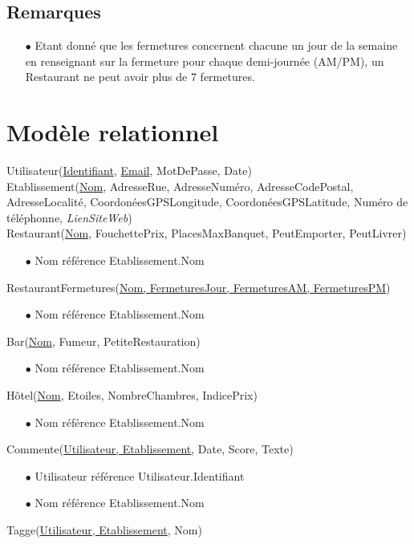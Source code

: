 \documentclass[a4paper, 11pt]{article}
\begin{document}
\subsection*{Remarques}
\begin{itemize}
	\item[$\bullet$] Etant donné que les fermetures concernent chacune un jour de la semaine en renseignant sur la fermeture pour chaque demi-journée (AM/PM), un Restaurant ne peut avoir plus de 7 fermetures. 
\end{itemize}

\section*{Modèle relationnel}
\noindent
Utilisateur(\underline{Identifiant}, \underline{Email}, MotDePasse, Date)\\
Etablissement(\underline{Nom}, AdresseRue, AdresseNuméro, AdresseCodePostal, AdresseLocalité, CoordonéesGPSLongitude, CoordonéesGPSLatitude, Numéro de téléphonne, \textit{LienSiteWeb})\\
Restaurant(\underline{Nom}, FouchettePrix, PlacesMaxBanquet, PeutEmporter, PeutLivrer)
\begin{itemize}
	\item[$\bullet$] Nom référence Etablissement.Nom
\end{itemize}
RestaurantFermetures(\underline{Nom, FermeturesJour, FermeturesAM, FermeturesPM})
\begin{itemize}
	\item[$\bullet$] Nom référence Etablissement.Nom
\end{itemize}
Bar(\underline{Nom}, Fumeur, PetiteRestauration)
\begin{itemize}
	\item[$\bullet$] Nom référence Etablissement.Nom
\end{itemize}
Hôtel(\underline{Nom}, Etoiles, NombreChambres, IndicePrix)
\begin{itemize}
	\item[$\bullet$] Nom référence Etablissement.Nom
\end{itemize}
Commente(\underline{Utilisateur, Etablissement}, Date, Score, Texte)
\begin{itemize}
	\item[$\bullet$] Utilisateur référence Utilisateur.Identifiant
	\item[$\bullet$] Nom référence Etablissement.Nom
\end{itemize}
Tagge(\underline{Utilisateur, Etablissement}, Nom)
\end{document}

